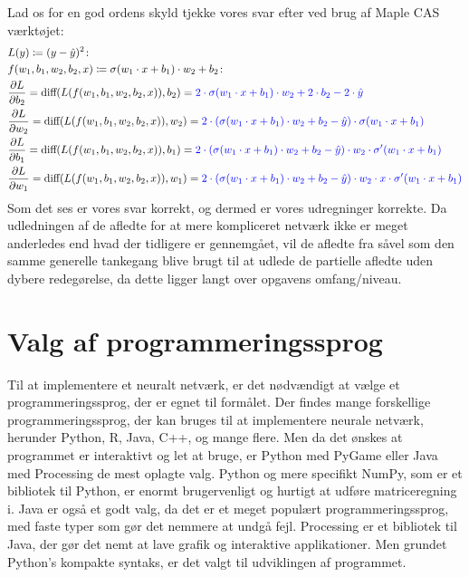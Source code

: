 \documentclass{article}
\begin{document}
Lad os for en god ordens skyld tjekke vores svar efter ved brug af Maple CAS værktøjet:
\begin{align}
  &L(y)\coloneqq(y-\hat{y})^{2}\colon\\
  &f(w_{1},b_{1},w_{2},b_{2},x)\coloneqq\sigma(w_{1}\cdot x+b_{1})\cdot w_{2}+b_{2}\colon\\
  &\frac{\partial L}{\partial b_{2}}=\text{diff}(L(f(w_{1},b_{1},w_{2},b_{2},x)),b_2)=\color{blue}2\cdot\sigma(w_{1}\cdot x+b_{1})\cdot w_{2}+2\cdot b_{2}-2\cdot\hat{y}\\
  &\frac{\partial L}{\partial w_{2}}= \text{diff}(L(f(w_{1},b_{1},w_{2},b_{2},x)),w_2)=\color{blue}2\cdot(\sigma(w_{1}\cdot x+b_{1})\cdot w_{2}+b_{2}-\hat{y})\cdot\sigma(w_{1}\cdot x+b_{1})\\
  &\frac{\partial L}{\partial b_{1}}= \text{diff}(L(f(w_{1},b_{1},w_{2},b_{2},x)),b_1)=\color{blue}2\cdot(\sigma(w_{1}\cdot x+b_{1})\cdot w_{2}+b_{2}-\hat{y})\cdot w_{2}\cdot\sigma'(w_{1}\cdot x+b_{1})\\
  &\frac{\partial L}{\partial w_{1}}= \text{diff}(L(f(w_{1},b_{1},w_{2},b_{2},x)),w_1)=\color{blue}2\cdot(\sigma(w_{1}\cdot x+b_{1})\cdot w_{2}+b_{2}-\hat{y})\cdot w_{2}\cdot x\cdot\sigma'(w_{1}\cdot x+b_{1})
\end{align}
Som det ses er vores svar korrekt, og dermed er vores udregninger korrekte. Da udledningen af de afledte for at mere kompliceret netværk ikke er meget anderledes end hvad der tidligere er gennemgået, vil de afledte fra \parencite{keita2023backpropagation,verma2020neuralnet,kurbiel2021softmax} såvel som den samme generelle tankegang blive brugt til at udlede de partielle afledte uden dybere redegørelse, da dette ligger langt over opgavens omfang/niveau.
\section{Valg af programmeringssprog}
Til at implementere et neuralt netværk, er det nødvændigt at vælge et programmeringssprog, der er egnet til formålet. Der findes mange forskellige programmeringssprog, der kan bruges til at implementere neurale netværk, herunder Python, R, Java, C++, og mange flere. Men da det ønskes at programmet er interaktivt og let at bruge, er Python med PyGame eller Java med Processing de mest oplagte valg. Python og mere specifikt NumPy, som er et bibliotek til Python, er enormt brugervenligt og hurtigt at udføre matriceregning i. Java er også et godt valg, da det er et meget populært programmeringssprog, med faste typer som gør det nemmere at undgå fejl. Processing er et bibliotek til Java, der gør det nemt at lave grafik og interaktive applikationer. Men grundet Python's kompakte syntaks, er det valgt til udviklingen af programmet.
\end{document}
